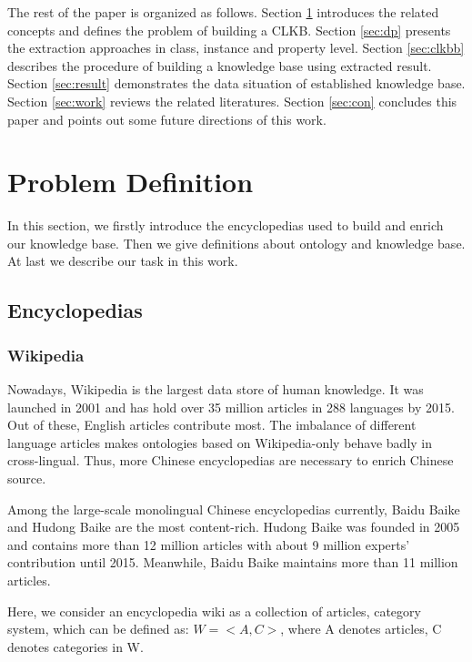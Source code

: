\documentclass[runningheads,a4paper]{llncs}
\begin{document}
The rest of the paper is organized as follows. Section \ref{sec:pd} introduces the related concepts and defines the problem of building a CLKB. Section \ref{sec:dp} presents the extraction approaches in class, instance and property level. Section \ref{sec:clkbb} describes the procedure of building a knowledge base using extracted result. Section \ref{sec:result} demonstrates the data situation of established knowledge base. Section \ref{sec:work} reviews the related literatures. Section \ref{sec:con} concludes this paper and points out some future directions of this work.

\section{Problem Definition}
\label{sec:pd}
In this section, we firstly introduce the encyclopedias used to build and enrich our knowledge base. Then we give definitions about ontology and knowledge base. At last we describe our task in this work.

\subsection{Encyclopedias}
\label{sec:encyclopedias}
\subsubsection{Wikipedia}
Nowadays, Wikipedia is the largest data store of human knowledge. It was launched in 2001 and has hold over 35 million articles in 288 languages by 2015. Out of these, English articles contribute most. The imbalance of different language articles makes ontologies based on Wikipedia-only behave badly in cross-lingual. Thus, more Chinese encyclopedias are necessary to enrich Chinese source.

Among the large-scale monolingual Chinese encyclopedias currently, Baidu Baike and Hudong Baike are the most content-rich. Hudong Baike was founded in 2005 and contains more than 12 million articles with about 9 million experts' contribution until 2015. Meanwhile, Baidu Baike maintains more than 11 million articles.

Here, we consider an encyclopedia wiki as a collection of articles, category system, which can be defined as: $W = <A,C>$, where A denotes articles, C denotes categories in W.
\end{document}
